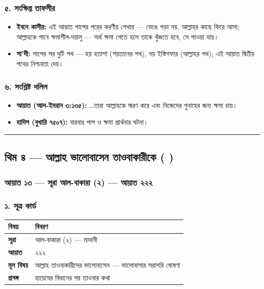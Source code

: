 \subsubsection*{৫. সংক্ষিপ্ত তাফসীর}

\begin{itemize}
\item \textbf{ইবনে কাসীর:} এই আয়াত পাপের পরের করণীয় শেখায় — ভেঙে পড়া নয়, আল্লাহর কাছে ফিরে আসা; আল্লাহকে পাবে ক্ষমাশীল-দয়ালু — অর্থ ক্ষমা পেতে হলে তাকে খুঁজতে হবে, সে পাওয়া যায়।
\item \textbf{সা'দী:} পাপের পর দুটি পথ — হয় হতাশা (শয়তানের পথ), নয় ইস্তিগফার (আল্লাহর পথ); এই আয়াত দ্বিতীয় পথের নিশ্চয়তা দেয়।
\end{itemize}
\subsubsection*{৬. সংশ্লিষ্ট দলিল}

\begin{itemize}
\item \textbf{আয়াত (আল-ইমরান ৩:১৩৫):} …তারা আল্লাহকে স্মরণ করে এবং নিজেদের গুনাহের জন্য ক্ষমা চায়।
\item \textbf{হাদিস (বুখারি ৭৫০৭):} বারবার পাপ ও ক্ষমা প্রার্থনার ঘটনা।
\end{itemize}
\medskip\hrule\medskip

\subsection*{থিম ৪ — আল্লাহ ভালোবাসেন তাওবাকারীকে (   )}

\subsubsection*{আয়াত ১৩ — সূরা আল-বাকারা (২) — আয়াত ২২২}

\subsubsection*{১. সূত্র কার্ড}

\begin{table}[h]\centering\small
\begin{tabular}{ll}
বিষয় & বিবরণ \\
\hline
\textbf{সূরা} & আল-বাকারা (২) — মাদানী \\
\textbf{আয়াত} & ২২২ \\
\textbf{মূল বিষয়} & আল্লাহ তাওবাকারীদের ভালোবাসেন — ভালোবাসার সরাসরি ঘোষণা \\
\textbf{প্রসঙ্গ} & হায়েযের বিধানের পর তাওবার কথা \\
\hline
\end{tabular}
\end{table}

